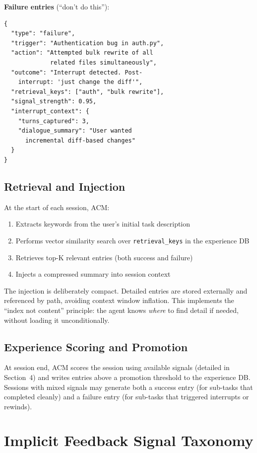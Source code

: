 \documentclass[conference]{IEEEtran}
\begin{document}
\textbf{Failure entries} (``don't do this''):
\begin{lstlisting}
{
  "type": "failure",
  "trigger": "Authentication bug in auth.py",
  "action": "Attempted bulk rewrite of all
             related files simultaneously",
  "outcome": "Interrupt detected. Post-
    interrupt: 'just change the diff'",
  "retrieval_keys": ["auth", "bulk rewrite"],
  "signal_strength": 0.95,
  "interrupt_context": {
    "turns_captured": 3,
    "dialogue_summary": "User wanted
      incremental diff-based changes"
  }
}
\end{lstlisting}

\subsection{Retrieval and Injection}

At the start of each session, ACM:

\begin{enumerate}
\item Extracts keywords from the user's initial task description
\item Performs vector similarity search over \texttt{retrieval\_keys} in the experience DB
\item Retrieves top-K relevant entries (both success and failure)
\item Injects a compressed summary into session context
\end{enumerate}

The injection is deliberately compact. Detailed entries are stored externally and referenced by path, avoiding context window inflation. This implements the ``index not content'' principle: the agent knows \emph{where} to find detail if needed, without loading it unconditionally.

\subsection{Experience Scoring and Promotion}

At session end, ACM scores the session using available signals (detailed in Section~4) and writes entries above a promotion threshold to the experience DB. Sessions with mixed signals may generate both a success entry (for sub-tasks that completed cleanly) and a failure entry (for sub-tasks that triggered interrupts or rewinds).

\section{Implicit Feedback Signal Taxonomy}
\end{document}
